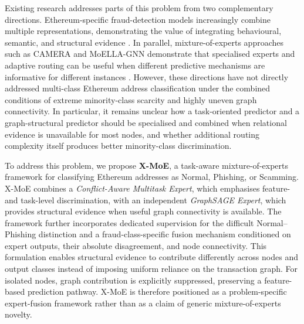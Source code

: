 \documentclass{ieeeaccess}
\begin{document}
Existing research addresses parts of this problem from two complementary directions. Ethereum-specific fraud-detection models increasingly combine multiple representations, demonstrating the value of integrating behavioural, semantic, and structural evidence \cite{sun2025tlmg4eth,jia2026kgbert4eth}. In parallel, mixture-of-experts approaches such as CAMERA and MoELLA-GNN demonstrate that specialised experts and adaptive routing can be useful when different predictive mechanisms are informative for different instances \cite{pan2026camera,peng2026moella}. However, these directions have not directly addressed multi-class Ethereum address classification under the combined conditions of extreme minority-class scarcity and highly uneven graph connectivity. In particular, it remains unclear how a task-oriented predictor and a graph-structural predictor should be specialised and combined when relational evidence is unavailable for most nodes, and whether additional routing complexity itself produces better minority-class discrimination.

To address this problem, we propose \textbf{X-MoE}, a task-aware mixture-of-experts framework for classifying Ethereum addresses as Normal, Phishing, or Scamming. X-MoE combines a \textit{Conflict-Aware Multitask Expert}, which emphasises feature- and task-level discrimination, with an independent \textit{GraphSAGE Expert}, which provides structural evidence when useful graph connectivity is available. The framework further incorporates dedicated supervision for the difficult Normal--Phishing distinction and a fraud-class-specific fusion mechanism conditioned on expert outputs, their absolute disagreement, and node connectivity. This formulation enables structural evidence to contribute differently across nodes and output classes instead of imposing uniform reliance on the transaction graph. For isolated nodes, graph contribution is explicitly suppressed, preserving a feature-based prediction pathway. X-MoE is therefore positioned as a problem-specific expert-fusion framework rather than as a claim of generic mixture-of-experts novelty.
\end{document}
